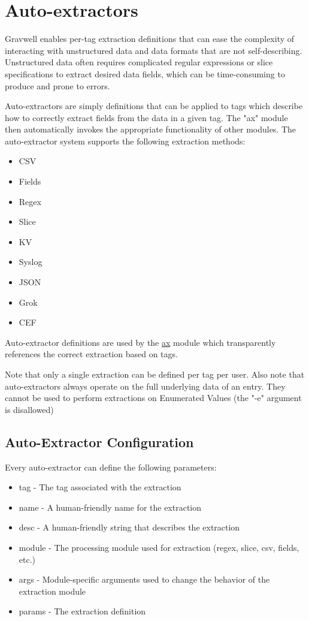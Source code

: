 \section{Auto-extractors}
Gravwell enables per-tag extraction definitions that can ease the
complexity of interacting with unstructured data and data formats that
are not self-describing. Unstructured data often requires complicated
regular expressions or slice specifications to extract desired data
fields, which can be time-consuming to produce and prone to errors.

Auto-extractors are simply definitions that can be applied to tags which
describe how to correctly extract fields from the data in a given tag.
The "ax" module then automatically invokes the appropriate functionality
of other modules. The auto-extractor system supports the following
extraction methods:

\begin{itemize}
\tightlist
\item
  CSV
\item
  Fields
\item
  Regex
\item
  Slice
\item
  KV
\item
  Syslog
\item
  JSON
\item
  Grok
\item
  CEF
\end{itemize}

Auto-extractor definitions are used by
the \href{https://docs.gravwell.io/\#!search/ax/ax.md}{ax} module
which transparently references the correct extraction based on tags.

Note that only a single extraction can be defined per tag per user. Also note
that auto-extractors always operate on the full underlying data of an
entry. They cannot be used to perform extractions on Enumerated Values
(the "-e" argument is disallowed)

\subsection{Auto-Extractor Configuration}

Every auto-extractor can define the following parameters:

\begin{itemize}
\item
  tag - The tag associated with the extraction
\item
  name - A human-friendly name for the extraction
\item
  desc - A human-friendly string that describes the extraction
\item
  module - The processing module used for extraction (regex, slice,
  csv, fields, etc.)
\item
  args - Module-specific arguments used to change the behavior of the
  extraction module
\item
  params - The extraction definition
\end{itemize}

